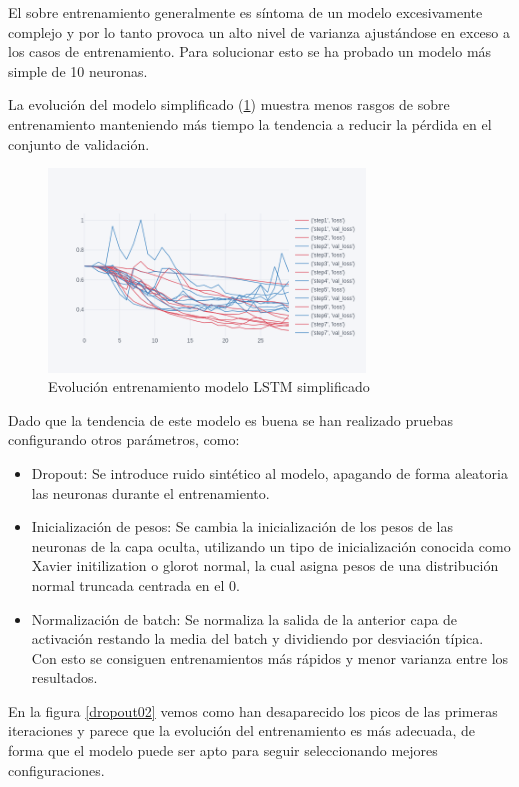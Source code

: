 El sobre entrenamiento generalmente es síntoma de un modelo excesivamente complejo y por lo tanto provoca un alto nivel de varianza ajustándose en exceso a los casos de entrenamiento. Para solucionar esto se ha probado un modelo más simple de 10 neuronas.

La evolución del modelo simplificado (\ref{simple}) muestra menos rasgos de sobre entrenamiento manteniendo más tiempo la tendencia a reducir la pérdida en el conjunto de validación.

\begin{figure}[H]
	\centering
	\includegraphics[width=0.75\textwidth]{imaxes/simple.png}
	\caption{Evolución entrenamiento modelo LSTM simplificado}
	\label{simple}
\end{figure}

Dado que la tendencia de este modelo es buena se han realizado pruebas configurando otros parámetros, como:

\begin{itemize}
	\item Dropout: Se introduce ruido sintético al modelo, apagando de forma aleatoria las neuronas durante el entrenamiento.
	\item Inicialización de pesos: Se cambia la inicialización de los pesos de las neuronas de la capa oculta, utilizando un tipo de inicialización conocida como Xavier initilization \cite{Glorot} o glorot normal, la cual asigna pesos de una distribución normal truncada centrada en el 0.
	\item Normalización de batch: Se normaliza la salida de la anterior capa de activación restando la media del batch y dividiendo por desviación típica. Con esto se consiguen entrenamientos más rápidos y menor varianza entre los resultados.
\end{itemize}

En la figura \ref{dropout02} vemos como han desaparecido los picos de las primeras iteraciones y parece que la evolución del entrenamiento es más adecuada, de forma que el modelo puede ser apto para seguir seleccionando mejores configuraciones.

